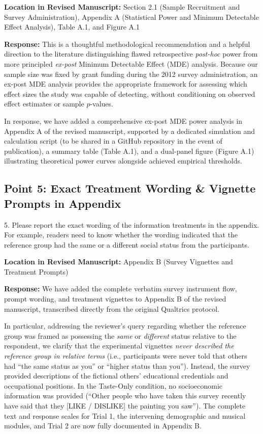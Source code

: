 \documentclass[11pt, letterpaper]{article}
\begin{document}
\textbf{Location in Revised Manuscript:} Section 2.1 (Sample Recruitment and Survey Administration), Appendix A (Statistical Power and Minimum Detectable Effect Analysis), Table A.1, and Figure A.1

\textbf{Response:}
This is a thoughtful methodological recommendation and a helpful direction to the literature distinguishing flawed retrospective \textit{post-hoc} power from more principled \textit{ex-post} Minimum Detectable Effect (MDE) analysis. Because our sample size was fixed by grant funding during the 2012 survey administration, an ex-post MDE analysis provides the appropriate framework for assessing which effect sizes the study was capable of detecting, without conditioning on observed effect estimates or sample $p$-values.

In response, we have added a comprehensive ex-post MDE power analysis in Appendix A of the revised manuscript, supported by a dedicated simulation and calculation script (to be shared in a GitHub repository in the event of publication), a summary table (Table A.1), and a dual-panel figure (Figure A.1) illustrating theoretical power curves alongside achieved empirical thresholds. 

\subsection*{Point 5: Exact Treatment Wording \& Vignette Prompts in Appendix}

\begin{reviewercomment}
5. Please report the exact wording of the information treatments in the appendix. For example, readers need to know whether the wording indicated that the reference group had the same or a different social status from the participants.
\end{reviewercomment}

\textbf{Location in Revised Manuscript:} Appendix B (Survey Vignettes and Treatment Prompts)

\textbf{Response:}
We have added the complete verbatim survey instrument flow, prompt wording, and treatment vignettes to Appendix B of the revised manuscript, transcribed directly from the original Qualtrics protocol.

In particular, addressing the reviewer's query regarding whether the reference group was framed as possessing the \textit{same} or \textit{different} status relative to the respondent, we clarify that the experimental vignettes \textit{never described the reference group in relative terms} (i.e., participants were never told that others had ``the same status as you'' or ``higher status than you''). Instead, the survey provided descriptions of the fictional others' educational credentials and occupational positions. In the Taste-Only condition, no socioeconomic information was provided (``Other people who have taken this survey recently have said that they [LIKE / DISLIKE] the painting you saw''). The complete text and response scales for Trial 1, the intervening demographic and musical modules, and Trial 2 are now fully documented in Appendix B.
\end{document}
